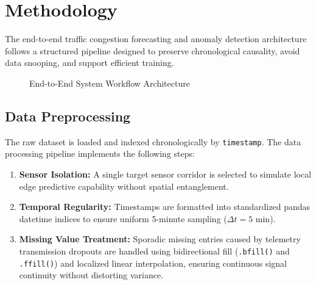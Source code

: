 \documentclass[12pt,a4paper]{article}
\begin{document}
\section{Methodology}
The end-to-end traffic congestion forecasting and anomaly detection architecture follows a structured pipeline designed to preserve chronological causality, avoid data snooping, and support efficient training.

\begin{figure}[H]
    \centering
    \caption{End-to-End System Workflow Architecture}
    \label{fig:workflow}
\end{figure}

\subsection{Data Preprocessing}
The raw dataset is loaded and indexed chronologically by \texttt{timestamp}. The data processing pipeline implements the following steps:
\begin{enumerate}
    \item \textbf{Sensor Isolation:} A single target sensor corridor is selected to simulate local edge predictive capability without spatial entanglement.
    \item \textbf{Temporal Regularity:} Timestamps are formatted into standardized pandas datetime indices to ensure uniform 5-minute sampling ($\Delta t = 5$ min).
    \item \textbf{Missing Value Treatment:} Sporadic missing entries caused by telemetry transmission dropouts are handled using bidirectional fill (\texttt{.bfill()} and \texttt{.ffill()}) and localized linear interpolation, ensuring continuous signal continuity without distorting variance.
\end{enumerate}
\end{document}
